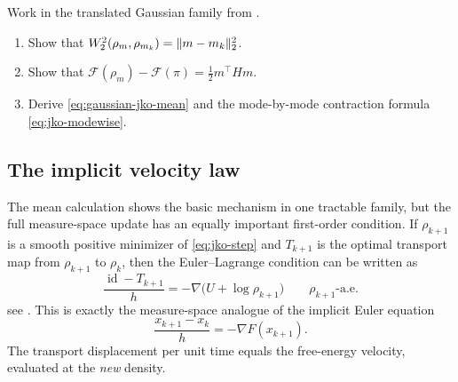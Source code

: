 \documentclass[11pt]{article}
\newif\ifshowsolutions
\newcommand{\SolutionBox}[2][10]{%
  \ifshowsolutions
    \begin{tcolorbox}[stat221panelgray,title={Solution}]
    #2
    \end{tcolorbox}
  \else
    \begin{tcolorbox}[stat221panelgray,unbreakable,title={Workspace}]
    \vspace{#1\baselineskip}
    \end{tcolorbox}
  \fi
}
\begin{document}
\begin{exercise}
\label{ex:gaussian-jko-mean}
Work in the translated Gaussian family from .
\begin{enumerate}[leftmargin=*]
  \item Show that $W_2^2(\rho_m,\rho_{m_k})=\lVert m-m_k\rVert_2^2$.
  \item Show that $\mathcal{F}(\rho_m)-\mathcal{F}(\pi)=\tfrac12 m^\top Hm$.
  \item Derive \eqref{eq:gaussian-jko-mean} and the mode-by-mode contraction formula \eqref{eq:jko-modewise}.
\end{enumerate}
\end{exercise}
\SolutionBox[16]{%
\begin{enumerate}[leftmargin=*]
  \item Since $\rho_m$ and $\rho_{m_k}$ have the same covariance, the optimal transport is just translation by $m-m_k$, so
  \[
  W_2^2(\rho_m,\rho_{m_k})=\norm{m-m_k}_2^2.
  \]
  \item By \Cref{prop:free-energy-kl},
  \[
  \mathcal{F}(\rho_m)-\mathcal{F}(\pi)=D_{\mathrm{KL}}(\rho_m\|\pi).
  \]
  For Gaussians with equal covariance $H^{-1}$, the KL divergence reduces to the quadratic mean term
  \[
  D_{\mathrm{KL}}(\rho_m\|\pi)=\frac12 m^\top Hm.
  \]
  \item Therefore the JKO objective restricted to translated Gaussians is
  \[
  \Phi(m)=\frac{1}{2h}\norm{m-m_k}_2^2+\frac12 m^\top Hm.
  \]
  Its gradient is
  \[
  \nabla \Phi(m)=\frac{1}{h}(m-m_k)+Hm.
  \]
  Setting this to zero at the minimizer gives
  \[
  \frac{1}{h}(m_{k+1}-m_k)+Hm_{k+1}=0,
  \]
  hence
  \[
  m_{k+1}=(I_d+hH)^{-1}m_k.
  \]
  If $H=Q\Lambda Q^\top$ and $u_k=Q^\top m_k$, then
  \[
  u_{k+1}=Q^\top(I_d+hH)^{-1}Q\,u_k=(I_d+h\Lambda)^{-1}u_k,
  \]
  so each coordinate satisfies
  \[
  u_{k+1,i}=\frac{1}{1+h\lambda_i}u_{k,i}.
  \]
\end{enumerate}%
}

\subsection{The implicit velocity law}
\label{subsec:jko-velocity-law}

The mean calculation shows the basic mechanism in one tractable family, but the full measure-space update has an equally important first-order condition.
If $\rho_{k+1}$ is a smooth positive minimizer of \eqref{eq:jko-step} and $T_{k+1}$ is the optimal transport map from $\rho_{k+1}$ to $\rho_k$, then the Euler--Lagrange condition can be written as
\begin{equation}
  \frac{\operatorname{id}-T_{k+1}}{h}
  =
  -\nabla\bigl(U+\log \rho_{k+1}\bigr)
  \qquad \rho_{k+1}\text{-a.e.}
  \label{eq:jko-euler-lagrange}
\end{equation}
see \citet[\S4.5, Prop.~4.16]{santambrogio_2016_gradient_flows_overview}.
This is exactly the measure-space analogue of the implicit Euler equation
\[
\frac{x_{k+1}-x_k}{h}=-\nabla F(x_{k+1}).
\]
The transport displacement per unit time equals the free-energy velocity, evaluated at the \emph{new} density.
\end{document}
